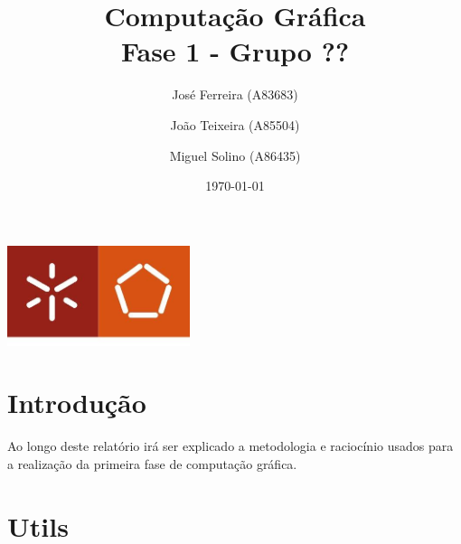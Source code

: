 \documentclass[a4paper]{report}
\begin{document}
\title{Computação Gráfica\\
\large Fase 1 - Grupo ??}
\author{José Ferreira (A83683) \and João Teixeira (A85504) \and Miguel Solino (A86435)}
\date{\today}

\begin{center}
    \begin{minipage}{0.75\linewidth}
        \centering
        \includegraphics[width=0.4\textwidth]{images/eng.jpeg}\par\vspace{1cm}
        \vspace{1.5cm}
        \href{https://www.uminho.pt/PT}
        {\color{black}{\scshape\LARGE Universidade do Minho}} \par
        \vspace{1cm}
        \href{https://www.di.uminho.pt/}
        {\color{black}{\scshape\Large Departamento de Informática}} \par
        \vspace{1.5cm}
        \maketitle
    \end{minipage}
\end{center}

\tableofcontents

\chapter{Introdução}
Ao longo deste relatório irá ser explicado a metodologia e raciocínio usados
para a realização da primeira fase de computação gráfica.

\chapter{Utils}
\end{document}
